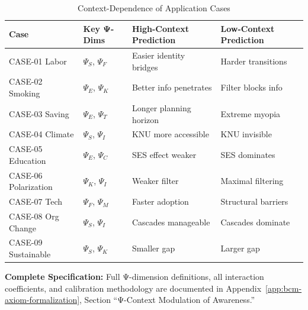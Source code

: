 \begin{table}[htbp]
\centering
\caption{Context-Dependence of Application Cases}
\label{tab:case-psi-dependence}
\small
\renewcommand{\arraystretch}{1.2}
\begin{tabular}{@{}llll@{}}
\toprule
\textbf{Case} & \textbf{Key Ψ-Dims} & \textbf{High-Context Prediction} & \textbf{Low-Context Prediction} \\
\midrule
CASE-01 Labor & $\Psi_S$, $\Psi_F$ & Easier identity bridges & Harder transitions \\
CASE-02 Smoking & $\Psi_E$, $\Psi_K$ & Better info penetrates & Filter blocks info \\
CASE-03 Saving & $\Psi_E$, $\Psi_T$ & Longer planning horizon & Extreme myopia \\
CASE-04 Climate & $\Psi_S$, $\Psi_I$ & KNU more accessible & KNU invisible \\
CASE-05 Education & $\Psi_E$, $\Psi_C$ & SES effect weaker & SES dominates \\
CASE-06 Polarization & $\Psi_K$, $\Psi_I$ & Weaker filter & Maximal filtering \\
CASE-07 Tech & $\Psi_F$, $\Psi_M$ & Faster adoption & Structural barriers \\
CASE-08 Org Change & $\Psi_S$, $\Psi_I$ & Cascades manageable & Cascades dominate \\
CASE-09 Sustainable & $\Psi_S$, $\Psi_K$ & Smaller gap & Larger gap \\
\bottomrule
\end{tabular}
\end{table}

\begin{cross-reference}
\textbf{Complete Specification:} Full Ψ-dimension definitions, all interaction coefficients, and calibration methodology are documented in Appendix~\ref{app:bcm-axiom-formalization}, Section ``Ψ-Context Modulation of Awareness.''
\end{cross-reference}

